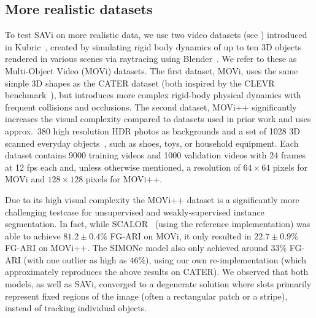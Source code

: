 \documentclass{article}
\newcommand{\modelname}{SAVi\xspace}
\begin{document}
\subsection{More realistic datasets}
To test \modelname on more realistic data, we use two video datasets (see ) introduced in Kubric~\citep{kubric2021}, created by simulating rigid body dynamics of up to ten 3D objects rendered in various scenes via raytracing using Blender~\citep{blender2021}.
We refer to these as Multi-Object Video (MOVi) datasets.
The first dataset, MOVi, uses the same simple 3D shapes as the CATER dataset (both inspired by the CLEVR benchmark~\citep{johnson2017clevr}), but introduces more complex rigid-body physical dynamics with frequent collisions and occlusions.
The second dataset, MOVi++ significantly increases the visual complexity compared to datasets used in prior work and uses approx.~380 high resolution HDR photos as backgrounds and a set of 1028 3D scanned everyday objects~\citep{gso2020}, such as shoes, toys, or household equipment.
Each dataset contains 9000 training videos and 1000 validation videos with 24 frames at 12 fps each and, unless otherwise mentioned, a resolution of $64\times64$ pixels for MOVi and $128\times128$ pixels for MOVi++.

Due to its high visual complexity the MOVi++ dataset is a significantly more challenging testcase for unsupervised and weakly-supervised instance segmentation. 
In fact, while SCALOR~\citep{jiang2019scalable} (using the reference implementation) was able to achieve $81.2\pm0.4\%$ FG-ARI on MOVi, it only resulted in $22.7\pm0.9\%$ FG-ARI on MOVi++.
The SIMONe model also only achieved around $33\%$ FG-ARI (with one outlier as high as $46\%$), using our own re-implementation (which approximately reproduces the above results on CATER).
We observed that both models, as well as \modelname, converged to a degenerate solution where slots primarily represent fixed regions of the image (often a rectangular patch or a stripe), instead of tracking individual objects.
\end{document}
